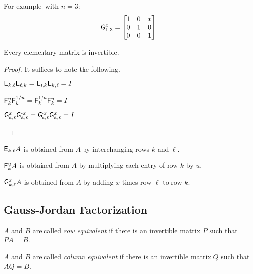\documentclass{memoir}
\begin{document}
\begin{dfn}
\begin{enumerate*}
For example, with $n = 3$: \[ \mathsf{G}_{{1},{3}}^{x} = \begin{bmatrix} 1 & 0 & x \\ 0 & 1 & 0 \\ 0 & 0 & 1 \end{bmatrix} \]
\end{enumerate*}
\end{dfn}

\begin{prp}
Every elementary matrix is invertible.
\end{prp}

\begin{proof}
It suffices to note the following.
\begin{enumerate*}
\item $\mathsf{E}_{{k},{\ell}} \mathsf{E}_{{\ell},{k}} = \mathsf{E}_{{\ell},{k}}\mathsf{E}_{{k},{\ell}} = I$
\item $\mathsf{F}_{k}^{u}\mathsf{F}_{k}^{1/u} = \mathsf{F}_{k}^{1/u}\mathsf{F}_{k}^{u} = I$
\item $\mathsf{G}_{{k},{\ell}}^{x}\mathsf{G}_{{k},{\ell}}^{\text{-}x} = \mathsf{G}_{{k},{\ell}}^{\text{-}x}\mathsf{G}_{{k},{\ell}}^{x} = I$ \qedhere
\end{enumerate*}
\end{proof}

\begin{prp} \mbox{}
\begin{enumerate*}
\item $\mathsf{E}_{{k},{\ell}} A$ is obtained from $A$ by interchanging rows $k$ and $\ell$.
\item $\mathsf{F}_{k}^{u} A$ is obtained from $A$ by multiplying each entry of row $k$ by $u$.
\item $\mathsf{G}_{{k},{\ell}}^{x} A$ is obtained from $A$ by adding $x$ times row $\ell$ to row $k$.
\end{enumerate*}
\end{prp}

\subsection{Gauss-Jordan Factorization}
\setcounter{section}{10}
\setcounter{dfn}{0}

\begin{dfn} \mbox{}
\begin{enumerate*}
\item $A$ and $B$ are called \emph{row equivalent} if there is an invertible matrix $P$ such that $PA = B$.
\item $A$ and $B$ are called \emph{column equivalent} if there is an invertible matrix $Q$ such that $AQ = B$.
\end{enumerate*}
\end{dfn}
\end{document}
